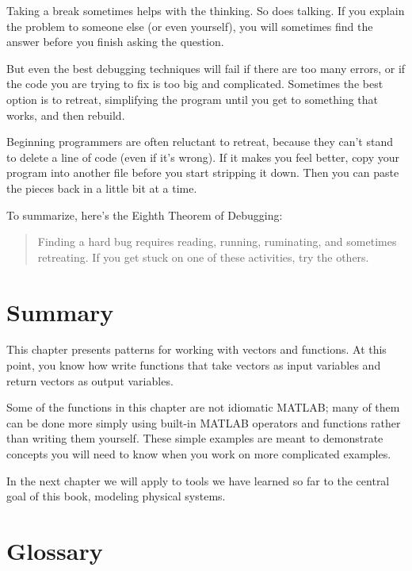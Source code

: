 
Taking a break sometimes helps with the thinking.  So does talking.
If you explain the problem to someone else (or even yourself), you
will sometimes find the answer before you finish asking the question.

But even the best debugging techniques will fail if there are too many
errors, or if the code you are trying to fix is too big and
complicated.  Sometimes the best option is to retreat, simplifying the
program until you get to something that works, and then rebuild.

Beginning programmers are often reluctant to retreat, because
they can't stand to delete a line of code (even if it's wrong).
If it makes you feel better, copy your program into another file
before you start stripping it down.  Then you can paste the pieces
back in a little bit at a time.


To summarize, here's the Eighth Theorem of Debugging:

\begin{quote}
Finding a hard bug requires reading, running, ruminating,
and sometimes retreating.  If you get stuck on one of these
activities, try the others.
\end{quote}

\section{Summary}

This chapter presents patterns for working with vectors and functions.  At this point, you know how write functions that take vectors as input variables and return vectors as output variables.

Some of the functions in this chapter are not idiomatic MATLAB; many of them can be done more simply using built-in MATLAB operators and functions rather than writing them yourself.  These simple examples are meant to demonstrate concepts you will need to know when you work on more complicated examples.

In the next chapter we will apply to tools we have learned so far to the central goal of this book, modeling physical systems.


\section{Glossary}


